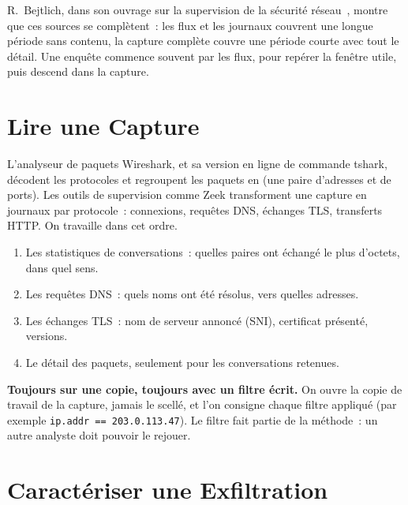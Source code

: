 R.~Bejtlich, dans son ouvrage sur la supervision de la sécurité
réseau~\cite{bejtlich2013nsm}, montre que ces sources se complètent~: les
flux et les journaux couvrent une longue période sans contenu, la capture
complète couvre une période courte avec tout le détail. Une enquête commence
souvent par les flux, pour repérer la fenêtre utile, puis descend dans la
capture.

\section{Lire une Capture}
\label{sec:c06-lire}

L'analyseur de paquets Wireshark, et sa version en ligne de commande tshark,
décodent les protocoles et regroupent les paquets en
 (une paire d'adresses et de ports). Les outils de
supervision comme Zeek transforment une capture en journaux par protocole~:
connexions, requêtes DNS, échanges TLS, transferts HTTP. On travaille dans
cet ordre.

\begin{enumerate}
    \item Les statistiques de conversations~: quelles paires ont échangé le
          plus d'octets, dans quel sens.
    \item Les requêtes DNS~: quels noms ont été résolus, vers quelles
          adresses.
    \item Les échanges TLS~: nom de serveur annoncé (SNI), certificat
          présenté, versions.
    \item Le détail des paquets, seulement pour les conversations retenues.
\end{enumerate}

\begin{boxinfo}
\textbf{Toujours sur une copie, toujours avec un filtre écrit.} On ouvre la
copie de travail de la capture, jamais le scellé, et l'on consigne chaque
filtre appliqué (par exemple \texttt{ip.addr == 203.0.113.47}). Le filtre
fait partie de la méthode~: un autre analyste doit pouvoir le rejouer.
\end{boxinfo}

\section{Caractériser une Exfiltration}
\label{sec:c06-exfiltration}

